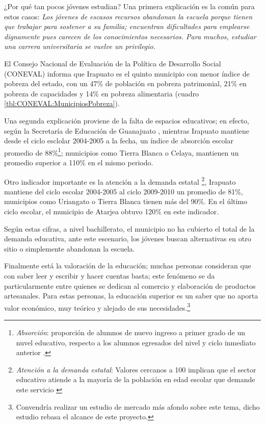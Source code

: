 ¿Por qué tan pocos jóvenes estudian? Una primera explicación es la común para estos casos: \emph{Los jóvenes de escasos recursos abandonan la escuela porque tienen que trabajar para sostener a su familia; encuentran dificultades para emplearse dignamente pues carecen de los conocimientos necesarios. Para muchos, estudiar una carrera universitaria se vuelve un privilegio.}

El Consejo Nacional de Evaluación de la Política de Desarrollo Social (CONEVAL) informa que Irapuato es el quinto municipio con menor índice de pobreza del estado, con un 47\% de población en pobreza patrimonial, 21\% en pobreza de capacidades y 14\% en pobreza alimentaria \citep{Coneval2009} (cuadro \ref{tbl:CONEVAL:MunicipiosPobreza}).

Una segunda explicación proviene de la falta de espacios educativos; en efecto, según la Secretaría de Educación de Guanajuato \citep{Seg2010}, mientras  Irapuato mantiene desde el ciclo esclolar 2004-2005 a la fecha, un índice de absorción escolar promedio de 88\%\footnote{\emph{Absorción}: proporción de alumnos de nuevo ingreso a primer grado de un nuvel educativo, respecto a los alumnos egresados del nivel y ciclo inmediato anterior \citep{Seg2010}.};
municipios como Tierra Blanca o Celaya, mantienen un promedio superior a 110\% en el mismo periodo.







Otro indicador importante es la atención a la demanda estatal \footnote{\emph{Atención a la demanda estatal}: Valores cercanos a 100 implican que el sector educativo atiende a la mayoría de la población en edad escolar que demande este servicio \citep{Seg2010}}, Irapuato mantiene del ciclo escolar 2004-2005 al ciclo 2009-2010 un promedio de 81\%, municipios como Uriangato o Tierra Blanca tienen más del 90\%. En el último ciclo escolar, el municipio de Atarjea obtuvo 120\% en este indicador.

Según estas cifras, a nivel bachillerato, el municipio no ha cubierto el total de la demanda educativa, ante este escenario, los jóvenes buscan alternativas en otro sitio o simplemente abandonan la escuela.

Finalmente está la valoración de la educación; muchas personas consideran que con saber leer y escribir y hacer cuentas basta; este fenómeno se da particularmente entre quienes se dedican al comercio y elaboración de productos artesanales. Para estas personas, la educación superior es un saber que no aporta valor económico, muy teórico y alejado de sus necesidades.\footnote{Convendría realizar un estudio de mercado más afondo sobre este tema, dicho estudio rebasa el alcance de este proyecto.}

